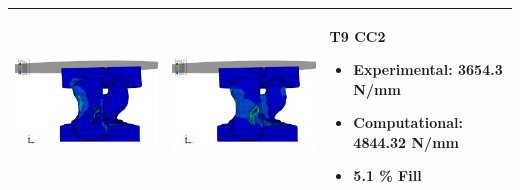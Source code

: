 \documentclass[11pt,a4paper]{article}
\begin{document}
\begin{landscape}
\begin{longtable}{|m{11cm}|m{11cm}|m{4cm}|}
\includegraphics[width=10cm]{images/T9_CC2_postVP_Interface_ABAQUS_All_Side_Stress.png}   & \includegraphics[width=10cm]{images/T9_CC2_postVP_Interface_ABAQUS_All_Side_Strain.png}   & T9 CC2  \begin{itemize} \item Experimental: 	3654.3	N/mm \item Computational:	4844.32 N/mm \item 5.1 \% Fill \end{itemize} \\ \hline 

\end{longtable}
\end{landscape}
\end{document}
